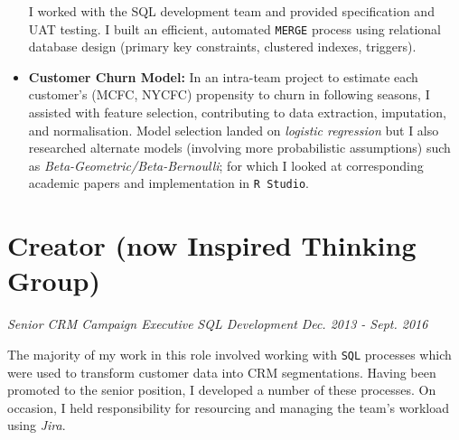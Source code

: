 \documentclass[letterpaper,11pt]{article}
\begin{document}
\begin{itemize}
{	      I worked with the SQL development team and provided specification and UAT testing. I built an efficient, automated \texttt{MERGE} process using relational database design (primary key constraints, clustered indexes, triggers).
	      }
	\item
	      {
	      \textbf{Customer Churn Model:}
	      In an intra-team project to estimate each customer's (MCFC, NYCFC) propensity to churn in following seasons, I assisted with feature selection, contributing to data extraction, imputation, and normalisation. Model selection landed on \textit{logistic regression} but I also researched alternate models (involving more probabilistic assumptions) such as \textit{Beta-Geometric/Beta-Bernoulli}; for which I looked at corresponding academic papers and implementation in \texttt{R Studio}.
	      }
\end{itemize}
\section{Creator (now Inspired Thinking Group)}
\textit{Senior CRM Campaign Executive}
\hfill
\textit{SQL Development}
\hfill
\textit{Dec. 2013 - Sept. 2016\\}

\noindent
The majority of my work in this role involved working with \texttt{SQL} processes which were used to transform customer data into CRM segmentations. Having been promoted to the senior position, I developed a number of these processes. On occasion, I held responsibility for resourcing and managing the team's workload using \textit{Jira}.
\end{document}
